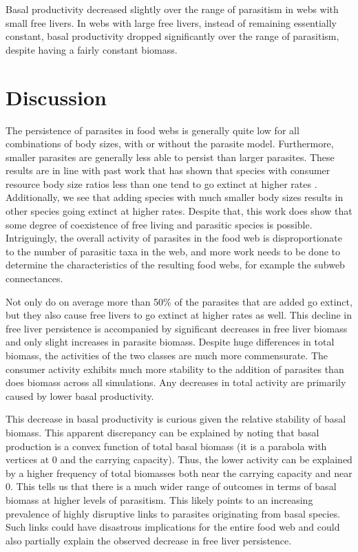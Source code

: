 \documentclass[/home/nkappler/Research/Dissertation/dissertation.tex]{subfiles}
\begin{document}
\begin{bibunit}
Basal productivity decreased slightly over the range of parasitism in webs with
small free livers. In webs with large free livers, instead of remaining
essentially constant, basal productivity dropped significantly over the range
of parasitism, despite having a fairly constant biomass.
 
\section{Discussion}

The persistence of parasites in food webs is generally quite low for all
combinations of body sizes, with or without the parasite model. Furthermore,
smaller parasites are generally less able to persist than larger parasites.
These results are in line with past work that has shown that species with
consumer resource body size ratios less than one tend to go extinct at higher
rates \cite{Brose2006b,Allesina2012}. Additionally, we see that adding species
with much smaller body sizes results in other species going extinct at higher
rates. Despite that, this work does show that some degree of coexistence of
free living and parasitic species is possible. Intriguingly, the overall
activity of parasites in the food web is disproportionate to the number of
parasitic taxa in the web, and more work needs to be done to determine the
characteristics of the resulting food webs, for example the subweb
connectances.

Not only do on average more than 50\% of the parasites that are added go
extinct, but they also cause free livers to go extinct at higher rates as well.
This decline in free liver persistence is accompanied by significant decreases
in free liver biomass and only slight increases in parasite biomass. Despite
huge differences in total biomass, the activities of the two classes are
much more commensurate. The consumer activity exhibits much more stability to
the addition of parasites than does biomass across all simulations. Any
decreases in total activity are primarily caused by lower basal productivity. 

This decrease in basal productivity is curious given the relative stability of
basal biomass. This apparent discrepancy can be explained by noting that basal
production is a convex function of total basal biomass (it is a parabola with
vertices at 0 and the carrying capacity). Thus, the lower activity can be
explained by a higher frequency of total biomasses both near the carrying
capacity and near 0. This tells us that there is a much wider range of outcomes
in terms of basal biomass at higher levels of parasitism. This likely points
to an increasing prevalence of highly disruptive links to parasites originating
from basal species. Such links could have disastrous implications for the
entire food web and could also partially explain the observed decrease in free
liver persistence.


\end{bibunit}
\end{document}

